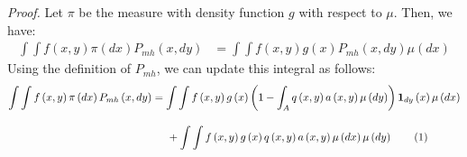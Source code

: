 \documentclass[10pt]{article}
\newcommand\numberthis{\addtocounter{equation}{1}\tag{\theequation}}
\begin{document}
\noindent
\textit{Proof.} Let $\pi$ be the measure with density function $g$ with respect to $\mu$. Then, we have:
\begin{align*}
    \int \int f \left( x, y \right) \pi \left( dx \right) P_{mh} \left( x, dy \right) 
    &= \int \int f \left( x, y \right) g \left( x \right) P_{mh} \left( x, dy \right) \mu \left( dx \right)
\end{align*}
Using the definition of $P_{mh}$, we can update this integral as follows:
\begin{align*}
    \int \int f \left( x, y \right) \pi \left( dx \right) P_{mh} \left( x, dy \right) 
    &= \int \int f \left( x, y \right) g \left( x \right)  \left( 1 - \int _{A} q \left( x, y \right) a \left( x, y \right) \mu \left( dy \right) \right) \mathbf{1}_{dy} \left( x \right) \mu \left( dx \right)  \\[1em]
    &\; \; \; \; \; + \int \int f \left( x, y \right) g \left( x \right) q \left( x, y \right) a \left( x, y \right) \mu \left( dx \right) \mu \left( dy \right) \numberthis \label{eqn}
\end{align*}
\end{document}
